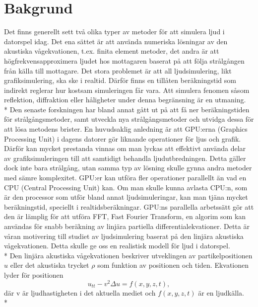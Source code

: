 \section*{Bakgrund}

Det finns generellt sett två olika typer av metoder för att simulera ljud i datorspel idag\cite{funkhouser}. Det ena sättet är att använda numeriska lösningar av den akustiska vågekvationen, t.ex. finita element metoder, det andra är att högfrekvensapproximera ljudet hos mottagaren baserat på att följa strålgången från källa till mottagare. Det stora problemet är att all ljudsimulering, likt grafiksimulering, ska ske i realtid. Därför finns en tillåten beräkningstid som indirekt reglerar hur kostsam simuleringen får vara. Att simulera fenomen såsom reflektion, diffraktion eller håligheter under denna begränsning är en utmaning.\\* 
Den senaste forskningen har bland annat gått ut på att få ner beräkningstiden för strålgångsmetoder, samt utveckla nya strålgångsmetoder och utvidga dessa för att lösa metodens brister. En huvudsaklig anledning är att GPU:erna (Graphics Processing Unit) i dagens datorer gör liknande operationer för ljus och grafik. Därför kan mycket prestanda vinnas om man lyckas att effektivt använda delar av grafiksimuleringen till att samtidigt behandla ljudutbredningen\cite{sjoberg}. Detta gäller dock inte bara strålgång, utan samma typ av lösning skulle gynna andra metoder med sämre komplexitet. GPU:er kan utföra fler operationer parallellt än vad en CPU (Central Processing Unit) kan. Om man skulle kunna avlasta CPU:n, som är den processor som utför bland annat ljudsimuleringar, kan man tjäna mycket beräkningstid, speciellt i realtidsberäkningar\cite{CPUcoGPU}. GPU:ns parallella arbetssätt gör att den är lämplig för att utföra FFT, Fast Fourier Transform, en algorim som kan användas för snabb beräkning av linjära partiella differentialekvationer. Detta är våran motivering till studiet av ljudsimulering baserat på den linjära akustiska vågekvationen. Detta skulle ge oss en realistisk modell för ljud i datorspel.\\*
\newline
Den linjära akustiska vågekvationen beskriver utveklingen av partikelpositionen $u$ eller det akustiska trycket $\rho$ som funktion av positionen och tiden. Ekvationen lyder för positionen
\begin{equation}
u_{tt} - v^{2}\Delta u = f(x,y,z,t),
\end{equation}
där v är ljudhastigheten i det aktuella mediet och $f(x,y,z,t)$ är en ljudkälla.\\*
